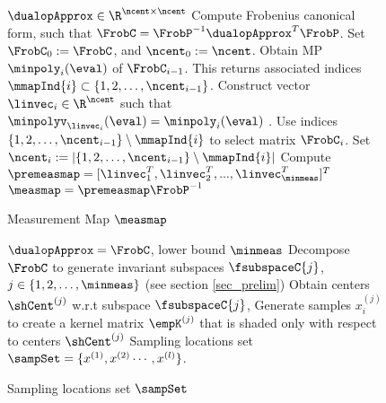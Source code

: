\begin{figure}[t!]
	\begin{algorithm}[H]
		\caption{Measurement Map $\measmap$}
		\label{alg:measmap}
		\begin{algorithmic}
			\begin{footnotesize} 
				 $\dualopApprox\in\R^{\ncent\times\ncent}$
				\STATE Compute Frobenius canonical form, such that $ \FrobC  = \FrobP^{-1} \dualopApprox^T\FrobP$. Set $\FrobC_0:=\FrobC$, and
				$\ncent_0:=\ncent$. 
				\STATE Obtain MP $\minpoly_i(\eval)$ of $\FrobC_{i-1}$. 
				This returns associated indices $\mmapInd{i}\subset\{1,2,\dots,\ncent_{i-1}\}$. 
				\STATE Construct vector $\linvec_i \in \R^{\ncent}$ such that 
				$\minpolyv_{\linvec_i}(\eval)=\minpoly_{i}(\eval)$ .
				\STATE Use indices $\{1,2,\dots,\ncent_{i-1}\}\setminus\mmapInd{i}$ to select matrix $\FrobC_i$. Set 
				$\ncent_i:= |\{1,2,\dots,\ncent_{i-1}\}\setminus\mmapInd{i}|$
				\ENDFOR
				\STATE Compute $ \premeasmap = [\linvec_1^T, \linvec_2^T,...,\linvec_{\minmeas}^T]^T$
				 $ \measmap =\premeasmap\FrobP^{-1}  $
			\end{footnotesize}
		\end{algorithmic}
	\end{algorithm} 
\end{figure}

\begin{figure}[t!]
	\begin{algorithm}[H]
		\caption{Sampling locations set $ \sampSet $}
		\label{alg:samples}
		\begin{algorithmic}
			\begin{footnotesize}	
				 $ \dualopApprox =\FrobC $, lower bound $\minmeas$
				\STATE Decompose $ \FrobC $ to generate invariant subspaces $ \fsubspaceC{j} $, $ j\in \{1,2,\dots,\minmeas\} $ (see section \ref{sec_prelim})
				\FOR{$j=1$ {\bfseries to} $\minmeas$}
				\STATE Obtain centers $\shCent^{(j)}$ w.r.t subspace $ \fsubspaceC{j} $,
				\STATE Generate samples $x_i^{(j)}$ to create a kernel matrix $\empK^{(j)}$ that is shaded only with respect to centers $\shCent^{(j)}$
				\ENDFOR
				 Sampling locations set  $\sampSet =\{x^{(1)}, x^{(2)}\cdots,x^{(l)}\} $.
			\end{footnotesize}		
		\end{algorithmic}
	\end{algorithm}
\end{figure}

